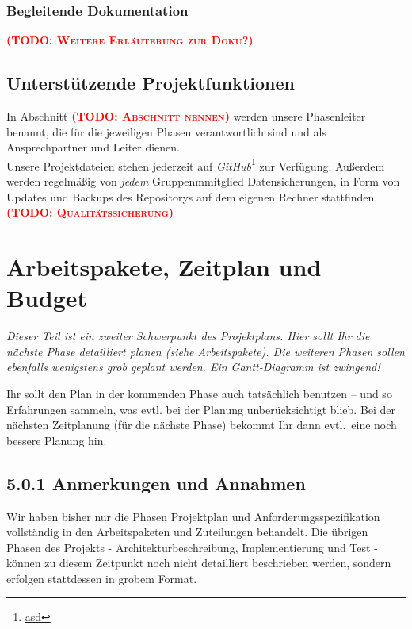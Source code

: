 \documentclass[fontsize=12pt,paper=a4,twoside]{scrartcl}
\newcommand{\todo}[1]{\textbf{\textsc{\textcolor{red}{(TODO: #1)}}}}
\begin{document}
\subsubsection{Begleitende Dokumentation}
\todo{Weitere Erläuterung zur Doku?}
\subsection{Unterstützende Projektfunktionen}
In Abschnitt \todo{Abschnitt nennen} werden unsere Phasenleiter benannt, die für die jeweiligen Phasen verantwortlich sind und als Ansprechpartner und Leiter dienen.\\
Unsere Projektdateien stehen jederzeit auf \emph{GitHub}\footnote{\url{asd}} zur Verfügung. Außerdem werden regelmäßig von \emph{jedem} Gruppenmmitglied Datensicherungen, in Form von Updates und Backups des Repositorys auf dem eigenen Rechner stattfinden.\\


\todo{Qualitätssicherung}


\section{Arbeitspakete, Zeitplan und Budget}

{\em Dieser Teil ist ein zweiter Schwerpunkt des Projektplans. Hier sollt Ihr die nächste Phase detailliert planen (siehe Arbeitspakete). Die weiteren Phasen sollen ebenfalls wenigstens grob geplant werden. Ein Gantt-Diagramm ist zwingend! 

Ihr sollt den Plan in der kommenden Phase auch tatsächlich benutzen -- und so
  Erfahrungen sammeln, was evtl. bei der Planung unberücksichtigt
  blieb. Bei der nächsten Zeitplanung (für die nächste Phase) bekommt
  Ihr dann evtl.\ eine noch bessere Planung hin.}

\subsection*{5.0.1 Anmerkungen und Annahmen}\label{aps}

Wir haben bisher nur die Phasen Projektplan und Anforderungsspezifikation vollständig in den Arbeitspaketen und Zuteilungen behandelt. Die übrigen Phasen des Projekts - Architekturbeschreibung, Implementierung und Test - können zu diesem Zeitpunkt noch nicht detailliert beschrieben werden, sondern erfolgen stattdessen in grobem Format. \\
\end{document}
